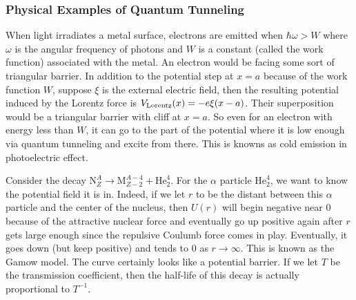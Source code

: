 \subsubsection{Physical Examples of Quantum Tunneling}
\begin{example}
    When light irradiates a metal surface, electrons are emitted when $\hbar\omega>W$ where $\omega$ is the angular frequency of photons and $W$ is a constant (called the work function) associated with the metal.
    An electron would be facing some sort of triangular barrier.
    In addition to the potential step at $x=a$ because of the work function $W$, suppose $\xi$ is the external electric field, then the resulting potential induced by the Lorentz force is $V_{\rm Lorentz}(x)=-e\xi(x-a)$.
    Their superposition would be a triangular barrier with cliff at $x=a$.
    So even for an electron with energy less than $W$, it can go to the part of the potential where it is low enough via quantum tunneling and excite from there.
    This is knowns as cold emission in photoelectric effect.
\end{example}
\begin{example}
    Consider the decay $\text{N}_{Z}^A\to \text{M}_{Z-2}^{A-4}+\text{He}_2^4$.
    For the $\alpha$ particle $\text{He}_2^4$, we want to know the potential field it is in.
    Indeed, if we let $r$ to be the distant between this $\alpha$ particle and the center of the nucleus, then $U(r)$ will begin negative near $0$ because of the attractive nuclear force and eventually go up positive again after $r$ gets large enough since the repulsive Coulumb force comes in play.
    Eventually, it goes down (but keep positive) and tends to $0$ as $r\to\infty$.
    This is known as the Gamow model.
    The curve certainly looks like a potential barrier.
    If we let $T$ be the transmission coefficient, then the half-life of this decay is actually proportional to $T^{-1}$.
\end{example}
